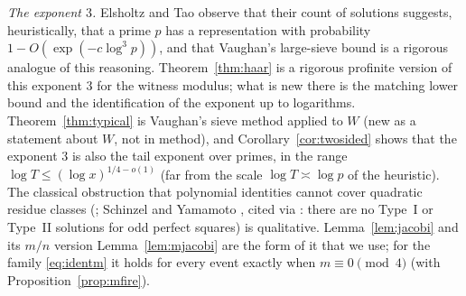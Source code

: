 \documentclass[11pt,reqno]{amsart}
\theoremstyle{definition}
\begin{document}
\emph{The exponent $3$.}  Elsholtz and Tao \cite[Remark~1.2]{ET} observe that
their count of solutions suggests, heuristically, that a prime $p$ has a
representation with probability $1-O(\exp(-c\log^3p))$, and that Vaughan's
large-sieve bound \cite{Vaughan} is a rigorous analogue of this reasoning.
Theorem~\ref{thm:haar} is a rigorous profinite version of this exponent $3$
for the witness modulus; what is new there is the matching lower bound and
the identification of the exponent up to logarithms.
Theorem~\ref{thm:typical} is Vaughan's sieve method applied to $W$ (new as a
statement about $W$, not in method), and Corollary~\ref{cor:twosided} shows
that the exponent $3$ is also the tail exponent over primes, in the range
$\log T\le(\log x)^{1/4-o(1)}$ (far from the scale $\log T\asymp\log p$ of the heuristic).  The classical
obstruction that polynomial identities cannot cover quadratic residue
classes (\cite{Mordell}; Schinzel and Yamamoto \cite{Yamamoto}, cited via
\cite[Prop.~1.6]{ET}: there are no Type~I or Type~II solutions for odd perfect
squares) is qualitative.
Lemma~\ref{lem:jacobi} and its $m/n$ version Lemma~\ref{lem:mjacobi} are the
form of it that we use; for the family \eqref{eq:identm} it holds for every
event exactly when $m\equiv0\pmod4$ (with Proposition~\ref{prop:mfire}).
\end{document}
